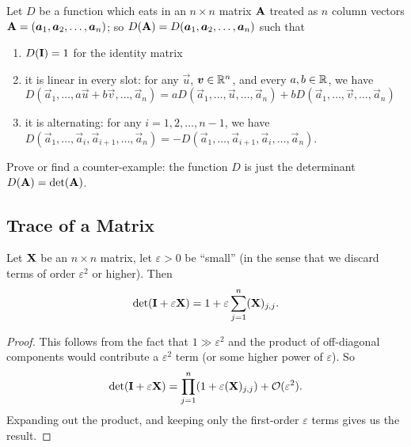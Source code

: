 \begin{exercise}
Let $D$ be a function which eats in an $n\times n$ matrix $\mathbf{A}$
treated as $n$ column vectors $\mathbf{A}=(\boldsymbol{a}_{1},\boldsymbol{a}_{2}, \dots,\boldsymbol{a}_{n})$;
so $D(\mathbf{A}) = D(\boldsymbol{a}_{1},\boldsymbol{a}_{2},\dots,\boldsymbol{a}_{n})$ such that
\begin{enumerate}
\item $D(\mathbf{I})=1$ for the identity matrix
\item it is linear in every slot: for any $\vec{u}$, $\boldsymbol{v}\in\mathbb{R}^{n}$,
  and every $a,b\in\mathbb{R}$, we have
  $D(\vec{a}_{1},\dots,a\vec{u}+b\vec{v},\dots,\vec{a}_{n})=aD(\vec{a}_{1},\dots,\vec{u},\dots,\vec{a}_{n}) + bD(\vec{a}_{1},\dots,\vec{v},\dots,\vec{a}_{n})$
\item it is alternating: for any $i=1,2,\dots,n-1$, we have
  $D(\vec{a}_{1},\dots,\vec{a}_{i},\vec{a}_{i+1},\dots,\vec{a}_{n})=-D(\vec{a}_{1},\dots,\vec{a}_{i+1},\vec{a}_{i},\dots,\vec{a}_{n})$.
\end{enumerate}
Prove or find a counter-example: the function $D$ is just the determinant $D(\mathbf{A})=\det(\mathbf{A})$.
\end{exercise}

\subsection{Trace of a Matrix}

\begin{proposition}\label{prop:determinant:trace-as-infinitesimal-determinant}
Let $\mathbf{X}$ be an $n\times n$ matrix, let $\varepsilon>0$ be ``small''
(in the sense that we discard terms of order $\varepsilon^{2}$ or higher).
Then
\begin{equation}
\det(\mathbf{I} + \varepsilon\mathbf{X}) = 1 + \varepsilon\sum^{n}_{j=1}(\mathbf{X})_{j,j}.
\end{equation}
\end{proposition}

\begin{proof}
This follows from the fact that $1\gg\varepsilon^{2}$ and the product of
off-diagonal components would contribute a $\varepsilon^{2}$ term (or
some higher power of $\varepsilon$). So
\begin{equation}
\det(\mathbf{I} + \varepsilon\mathbf{X}) = \prod^{n}_{j=1}(1 + \varepsilon(\mathbf{X})_{j,j})+\mathcal{O}(\varepsilon^{2}).
\end{equation}
Expanding out the product, and keeping only the first-order
$\varepsilon$ terms gives us the result.
\end{proof}

